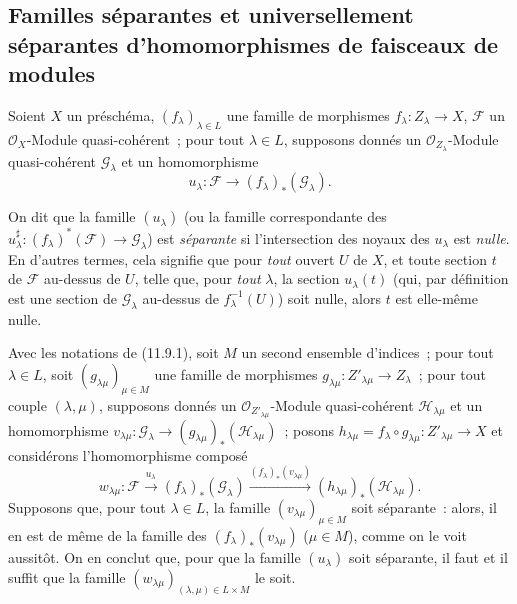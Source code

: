 \subsection{Familles séparantes et universellement séparantes d'homomorphismes
de faisceaux de modules}
\label{subsection:IV.11.9-fr}

\begin{env}[11.9.1]
\label{IV.11.9.1-fr}
Soient $X$ un préschéma, $(f_{\lambda})_{\lambda\in L}$ une famille de morphismes
$f_{\lambda}:Z_{\lambda}\to X$, $\mathcal F$ un $\mathcal O_X$-Module
quasi-cohérent~; pour tout $\lambda\in L$, supposons donnés un
$\mathcal O_{Z_{\lambda}}$-Module quasi-cohérent $\mathcal G_{\lambda}$ et un
homomorphisme
\begin{equation}
u_{\lambda}:\mathcal F\longrightarrow(f_{\lambda})_*(\mathcal G_{\lambda}).
\label{IV.11.9.1.1-fr}
\tag{11.9.1.1}
\end{equation}
\end{env}


On dit que la famille $(u_\lambda)$ (ou la famille correspondante des
$u^\sharp_\lambda:(f_\lambda)^*(\mathcal F)\to\mathcal G_\lambda$) est
\emph{séparante} si l'intersection des noyaux des $u_\lambda$ est
\emph{nulle}. En d'autres termes, cela signifie que pour \emph{tout} ouvert
$U$ de $X$, et toute section $t$ de $\mathcal F$ au-dessus de $U$, telle que,
pour \emph{tout} $\lambda$, la section $u_\lambda(t)$ (qui, par définition est
une section de $\mathcal G_\lambda$ au-dessus de $f_\lambda^{-1}(U)$) soit
nulle, alors $t$ est elle-même nulle.

\begin{env}[11.9.2]
\label{IV.11.9.2-fr}
Avec les notations de (11.9.1), soit $M$ un second ensemble d'indices~; pour
tout $\lambda\in L$, soit $(g_{\lambda\mu})_{\mu\in M}$ une famille de
morphismes $g_{\lambda\mu}:Z'_{\lambda\mu}\to Z_\lambda$~; pour tout couple
$(\lambda,\mu)$, supposons donnés un $\mathcal O_{Z'_{\lambda\mu}}$-Module
quasi-cohérent $\mathcal H_{\lambda\mu}$ et un homomorphisme
$v_{\lambda\mu}:\mathcal G_\lambda\to
(g_{\lambda\mu})_*(\mathcal H_{\lambda\mu})$~; posons
$h_{\lambda\mu}=f_\lambda\circ g_{\lambda\mu}:Z'_{\lambda\mu}\to X$ et
considérons l'homomorphisme composé
\[
w_{\lambda\mu}:\mathcal F\xrightarrow{u_\lambda}
(f_\lambda)_*(\mathcal G_\lambda)
\xrightarrow{(f_\lambda)_*(v_{\lambda\mu})}
(h_{\lambda\mu})_*(\mathcal H_{\lambda\mu}).
\]
Supposons que, pour tout $\lambda\in L$, la famille
$(v_{\lambda\mu})_{\mu\in M}$ soit séparante~: alors, il en est de même de la
famille des $(f_\lambda)_*(v_{\lambda\mu})$ ($\mu\in M$), comme on le voit
aussitôt. On en conclut que, pour que la famille $(u_\lambda)$ soit séparante,
il faut et il suffit que la famille
$(w_{\lambda\mu})_{(\lambda,\mu)\in L\times M}$ le soit.
\end{env}

